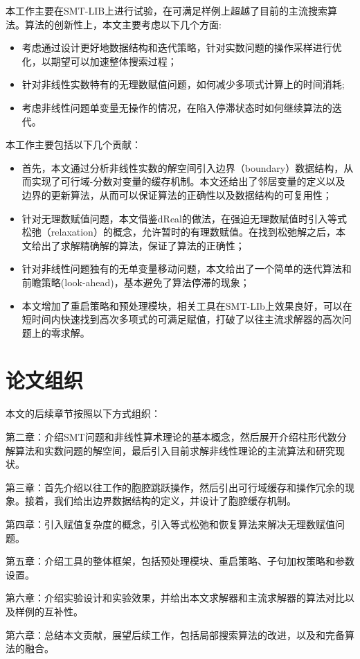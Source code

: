 本工作主要在SMT-LIB\cite{BarFT-SMTLIB}上进行试验，在可满足样例上超越了目前的主流搜索算法。算法的创新性上，本文主要考虑以下几个方面:
\begin{itemize}
    \item 考虑通过设计更好地数据结构和迭代策略，针对实数问题的操作采样进行优化，以期望可以加速整体搜索过程；
    \item 针对非线性实数特有的无理数赋值问题，如何减少多项式计算上的时间消耗;
    \item 考虑非线性问题单变量无操作的情况，在陷入停滞状态时如何继续算法的迭代。
\end{itemize}

本工作主要包括以下几个贡献：
\begin{itemize}
    \item 首先，本文通过分析非线性实数的解空间引入边界（boundary）数据结构，从而实现了可行域-分数对变量的缓存机制。本文还给出了邻居变量的定义以及边界的更新算法，从而可以保证算法的正确性以及数据结构的可复用性；
    \item 针对无理数赋值问题，本文借鉴dReal的做法，在强迫无理数赋值时引入等式松弛（relaxation）的概念，允许暂时的有理数赋值。在找到松弛解之后，本文给出了求解精确解的算法，保证了算法的正确性；
    \item 针对非线性问题独有的无单变量移动问题，本文给出了一个简单的迭代算法和前瞻策略(look-ahead)，基本避免了算法停滞的现象；
    \item 本文增加了重启策略和预处理模块，相关工具在SMT-LIb上效果良好，可以在短时间内快速找到高次多项式的可满足赋值，打破了以往主流求解器的高次问题上的零求解。
\end{itemize}

\section{论文组织}
本文的后续章节按照以下方式组织：

第二章：介绍SMT问题和非线性算术理论的基本概念，然后展开介绍柱形代数分解算法和实数问题的解空间，最后引入目前求解非线性理论的主流算法和研究现状。

第三章：首先介绍以往工作的胞腔跳跃操作，然后引出可行域缓存和操作冗余的现象。接着，我们给出边界数据结构的定义，并设计了胞腔缓存机制。

第四章：引入赋值复杂度的概念，引入等式松弛和恢复算法来解决无理数赋值问题。

第五章：介绍工具的整体框架，包括预处理模块、重启策略、子句加权策略和参数设置。

第六章：介绍实验设计和实验效果，并给出本文求解器和主流求解器的算法对比以及样例的互补性。

第六章：总结本文贡献，展望后续工作，包括局部搜索算法的改进，以及和完备算法的融合。